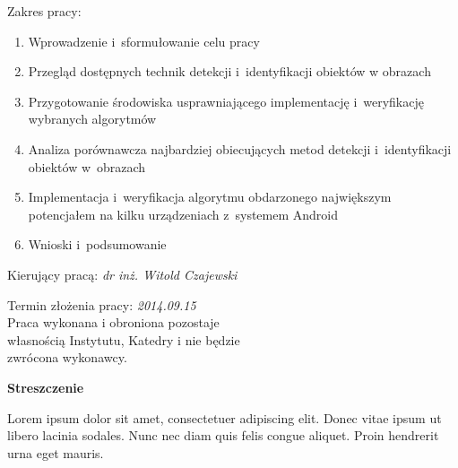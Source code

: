 \documentclass[a4paper,onecolumn,oneside,12pt]{mwrep}
\begin{document}
\begin{titlepage}
	\vspace*{1\baselineskip}
	
	\begin{flushleft}
	    \fontsize{12pt}{10pt}\selectfont
	    Zakres pracy:
	    \selectfont
	    \begin{enumerate}
	        \item Wprowadzenie i~sformułowanie celu pracy
	        \item Przegląd dostępnych technik detekcji
	        i~identyfikacji obiektów w obrazach
	        \item Przygotowanie środowiska usprawniającego
	        implementację i~weryfikację wybranych algorytmów
	        \item Analiza porównawcza najbardziej obiecujących
	        metod detekcji i~identyfikacji obiektów w~obrazach
	        \item Implementacja i~weryfikacja algorytmu
	        obdarzonego największym potencjałem na kilku
	        urządzeniach z~systemem Android
	        \item Wnioski i~podsumowanie
	    \end{enumerate}
	    \fontsize{12pt}{10pt}\selectfont
	    
	    \vspace*{1\baselineskip}
	
	    Kierujący pracą: \textit{dr inż. Witold Czajewski} \\
	    
	    \vspace*{4\baselineskip}
	    
	    \selectfont
	    Termin złożenia pracy: \textit{2014.09.15} \\
	    \fontsize{10pt}{8pt}\selectfont
        Praca wykonana i obroniona pozostaje \\
        własnością Instytutu, Katedry i nie będzie \\
        zwrócona wykonawcy.
	\end{flushleft}
\end{titlepage}

\begin{center}
\textbf{Streszczenie}
\end{center}

Lorem ipsum dolor sit amet, consectetuer adipiscing elit. Donec vitae ipsum ut
libero lacinia sodales. Nunc nec diam quis felis congue aliquet. Proin hendrerit
urna eget mauris.
\end{document}
